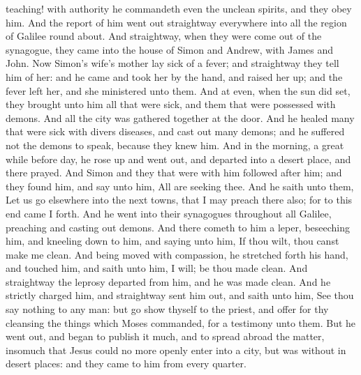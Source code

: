 teaching! with authority he commandeth even the unclean spirits, and they obey him. And the report of him went out straightway everywhere into all the region of Galilee round about.  And straightway, when they were come out of the synagogue, they came into the house of Simon and Andrew, with James and John. Now Simon’s wife’s mother lay sick of a fever; and straightway they tell him of her: and he came and took her by the hand, and raised her up; and the fever left her, and she ministered unto them.  And at even, when the sun did set, they brought unto him all that were sick, and them that were possessed with demons. And all the city was gathered together at the door. And he healed many that were sick with divers diseases, and cast out many demons; and he suffered not the demons to speak, because they knew him.  And in the morning, a great while before day, he rose up and went out, and departed into a desert place, and there prayed. And Simon and they that were with him followed after him; and they found him, and say unto him, All are seeking thee. And he saith unto them, Let us go elsewhere into the next towns, that I may preach there also; for to this end came I forth. And he went into their synagogues throughout all Galilee, preaching and casting out demons.  And there cometh to him a leper, beseeching him, and kneeling down to him, and saying unto him, If thou wilt, thou canst make me clean. And being moved with compassion, he stretched forth his hand, and touched him, and saith unto him, I will; be thou made clean. And straightway the leprosy departed from him, and he was made clean. And he strictly charged him, and straightway sent him out, and saith unto him, See thou say nothing to any man: but go show thyself to the priest, and offer for thy cleansing the things which Moses commanded, for a testimony unto them. But he went out, and began to publish it much, and to spread abroad the matter, insomuch that Jesus could no more openly enter into a city, but was without in desert places: and they came to him from every quarter. 

